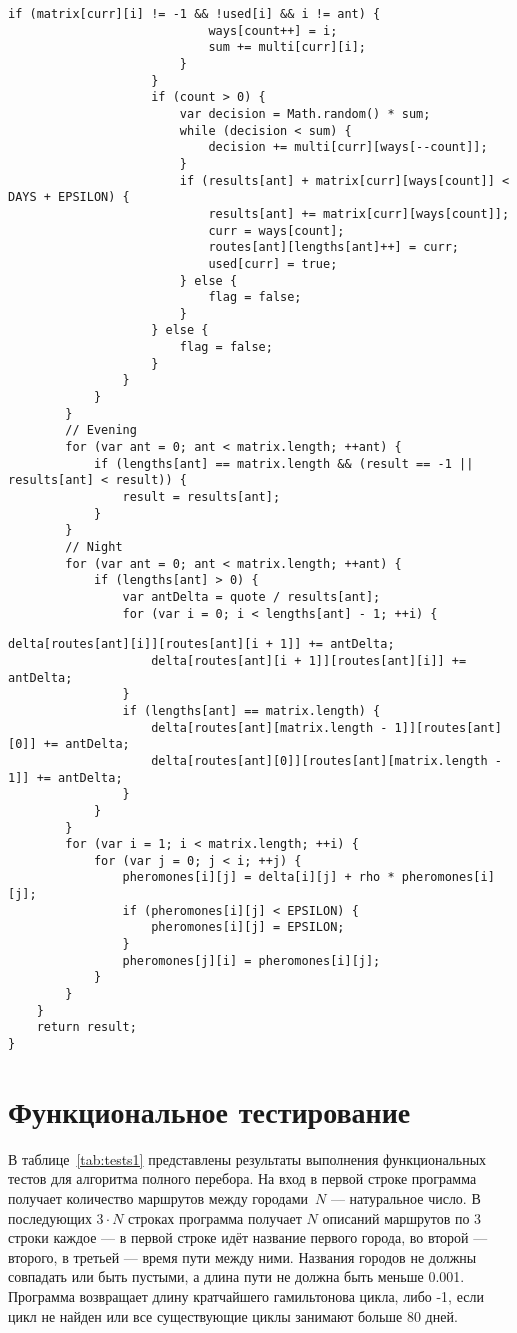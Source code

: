 \begin{lstlisting}[label=lst:ants3,caption=Реализация муравьиного алгоритма (продолжение)]
						if (matrix[curr][i] != -1 && !used[i] && i != ant) {
							ways[count++] = i;
							sum += multi[curr][i];
						}
					}
					if (count > 0) {
						var decision = Math.random() * sum;
						while (decision < sum) {
							decision += multi[curr][ways[--count]];
						}
						if (results[ant] + matrix[curr][ways[count]] < DAYS + EPSILON) {
							results[ant] += matrix[curr][ways[count]];
							curr = ways[count];
							routes[ant][lengths[ant]++] = curr;
							used[curr] = true;
						} else {
							flag = false;
						}
					} else {
						flag = false;
					}
				}
			}
		}
		// Evening
		for (var ant = 0; ant < matrix.length; ++ant) {
			if (lengths[ant] == matrix.length && (result == -1 || results[ant] < result)) {
				result = results[ant];
			}
		}
		// Night
		for (var ant = 0; ant < matrix.length; ++ant) {
			if (lengths[ant] > 0) {
				var antDelta = quote / results[ant];
				for (var i = 0; i < lengths[ant] - 1; ++i) {
\end{lstlisting}

\clearpage

\begin{lstlisting}[label=lst:ants4,caption=Реализация муравьиного алгоритма (окончание)]
					delta[routes[ant][i]][routes[ant][i + 1]] += antDelta;
					delta[routes[ant][i + 1]][routes[ant][i]] += antDelta;
				}
				if (lengths[ant] == matrix.length) {
					delta[routes[ant][matrix.length - 1]][routes[ant][0]] += antDelta;
					delta[routes[ant][0]][routes[ant][matrix.length - 1]] += antDelta;
				}
			}
		}
		for (var i = 1; i < matrix.length; ++i) {
			for (var j = 0; j < i; ++j) {
				pheromones[i][j] = delta[i][j] + rho * pheromones[i][j];
				if (pheromones[i][j] < EPSILON) {
					pheromones[i][j] = EPSILON;
				}
				pheromones[j][i] = pheromones[i][j];
			}
		}
	}
	return result;
}
\end{lstlisting}

\section{Функциональное тестирование}

В таблице~\ref{tab:tests1} представлены результаты выполнения функциональных тестов для алгоритма полного перебора. На вход в первой строке программа получает количество маршрутов между городами~$N$ --- натуральное число. В последующих $3 \cdot N$ строках программа получает $N$ описаний маршрутов по 3 строки каждое --- в первой строке идёт название первого города, во второй --- второго, в третьей --- время пути между ними. Названия городов не должны совпадать или быть пустыми, а длина пути не должна быть меньше 0.001. Программа возвращает длину кратчайшего гамильтонова цикла, либо -1, если цикл не найден или все существующие циклы занимают больше 80 дней. 

